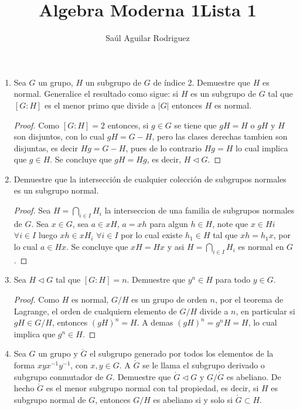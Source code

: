\documentclass{article}
\title{Algebra Moderna 1}
\title{Lista 1}
\author{Sa\'ul Aguilar Rodriguez}
\theoremstyle{break}
\begin{document}
\maketitle
	
	\begin{enumerate}
		\item Sea $G$ un grupo, $H$ un subgrupo de $G$ de \'indice 2. Demuestre que $H$ es normal. Generalice el resultado como sigue: si $H$ es un subgrupo de $G$ tal que $[G : H]$ es el menor primo que divide a $|G|$ entonces $H$ es normal.
		
		\begin{proof}
			Como $[G:H]=2$ entonces, si $g\in G$ se tiene que $gH=H$ o $gH$ y $H$ son disjuntos, con lo cual $gH=G-H$, pero las clases derechas tambien son disjuntas, es decir $Hg=G-H$, pues de lo contrario $Hg=H$ lo cual implica que $g\in H$. Se concluye que $gH=Hg$, es decir, $H\triangleleft G$.
		\end{proof}
		
	\item Demuestre que la intersecci\'on de cualquier colecci\'on de subgrupos normales es un subgrupo normal.
	
	\begin{proof}
		Sea $H=\displaystyle\bigcap_{i\in I}{H_i}$ la interseccion de una familia de subgrupos normales de $G$. Sea $x\in G$, sea $a\in xH$, $a=xh$ para algun $h\in H$, note que $x\in Hi$ $\forall i\in I$ luego $xh\in xH_i$ $\forall i\in I$ por lo cual existe $h_1\in H$ tal que $xh=h_1x$, por lo cual $a\in Hx$. Se concluye que $xH=Hx$ y asi $H=\displaystyle\bigcap_{i\in I}{H_i}$ es normal en $G$.
	\end{proof}
	
	\item	Sea $H\triangleleft G$ tal que $[G:H]=n$. Demuestre que $y^n\in H$ para todo $y\in G$.
	
	\begin{proof}
		Como $H$ es normal, $G/H$ es un grupo de orden $n$, por el teorema de Lagrange, el orden de cualquiern elemento de $G/H$ divide a $n$, en particular si $gH\in G/H$, entonces $(gH)^n=H$. A demas $(gH)^n=g^nH=H$, lo cual implica que $g^n\in H$.
	\end{proof}
	
	\item Sea $G$ un grupo y $\acute{G}$ el subgrupo generado por todos los elementos de la forma $xyx^{-1}y^{-1}$, con $x,y\in G$. A $\acute{G}$ se le llama el subgrupo derivado o subgrupo conmutador de $G$. Demuestre que $\acute{G}\triangleleft G$ y $G/\acute{G}$ es abeliano. De hecho $\acute{G}$ es el menor subgrupo normal con tal propiedad, es decir, si $H$ es subgrupo normal de $G$, entonces $G/H$ es abeliano si y solo si $\acute{G}\subset H$.
		

\end{enumerate}
\end{document}
